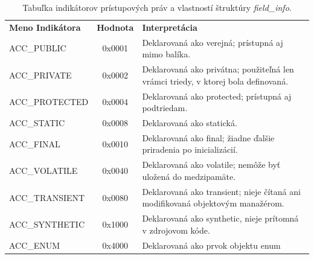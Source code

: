 \documentclass[11pt,final,oneside]{fithesis}
\begin{document}
\begin{table}
  \begin{tabular}{| l | c | p{} |}
    \hline
    \textbf{Meno Indikátora} & \textbf{Hodnota} & \textbf{Interpretácia} \\
    \hhline{|=|=|=|}
    ACC\_PUBLIC & 0x0001 & Deklarovaná ako verejná; prístupná aj mimo balíka.
    \\ \hline
    ACC\_PRIVATE & 0x0002 & Deklarovaná ako privátna; použiteľná len vrámci 
    triedy, v ktorej bola definovaná. \\ \hline
    ACC\_PROTECTED & 0x0004 & Deklarovaná ako protected; prístupná aj 
    podtriedam. \\ \hline
    ACC\_STATIC & 0x0008 & Deklarovaná ako statická. \\ \hline
    ACC\_FINAL & 0x0010 & Deklarovaná ako final; žiadne ďalšie priradenia po
    inicializácií. \\ \hline
    ACC\_VOLATILE & 0x0040 & Deklarovaná ako volatile; nemôže byť uložená do
    medzipamäte. \\ \hline
    ACC\_TRANSIENT & 0x0080 & Deklarovaná ako transient; nieje čítaná ani
    modifikovaná objektovým manažérom. \\ \hline
    ACC\_SYNTHETIC & 0x1000 & Deklarovaná ako synthetic, nieje prítomná v
    zdrojovom kóde. \\ \hline
    ACC\_ENUM & 0x4000 & Deklarovaná ako prvok objektu enum \\
    \hline
  \end{tabular}
  \caption{Tabuľka indikátorov prístupových práv a vlastností štruktúry
  \textit {field\_info}.}
  \label{tab:tab4}
\end{table}
\end{document}
